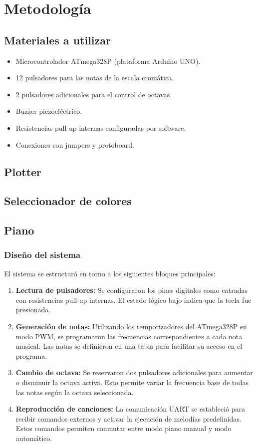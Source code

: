 \newpage

\section{Metodología}

\subsection{Materiales a utilizar}
\begin{itemize}
    \item Microcontrolador ATmega328P (plataforma Arduino UNO).
    \item 12 pulsadores para las notas de la escala cromática.
    \item 2 pulsadores adicionales para el control de octavas.
    \item Buzzer piezoeléctrico.
    \item Resistencias pull-up internas configuradas por software.
    \item Conexiones con jumpers y protoboard.
\end{itemize}

\subsection{Plotter}

\subsection{Seleccionador de colores}

\subsection{Piano}
\subsubsection{Diseño del sistema}
El sistema se estructuró en torno a los siguientes bloques principales:
\begin{enumerate}
    \item \textbf{Lectura de pulsadores:} Se configuraron los pines digitales como entradas con resistencias pull-up internas. El estado lógico bajo indica que la tecla fue presionada.
    \item \textbf{Generación de notas:} Utilizando los temporizadores del ATmega328P en modo PWM, se programaron las frecuencias correspondientes a cada nota musical. Las notas se definieron en una tabla para facilitar su acceso en el programa.
    \item \textbf{Cambio de octava:} Se reservaron dos pulsadores adicionales para aumentar o disminuir la octava activa. Esto permite variar la frecuencia base de todas las notas según la octava seleccionada.
    \item \textbf{Reproducción de canciones:} La comunicación UART se estableció para recibir comandos externos y activar la ejecución de melodías predefinidas. Estos comandos permiten conmutar entre modo piano manual y modo automático.
\end{enumerate}

